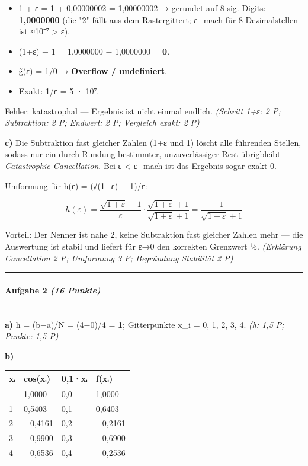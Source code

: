 \documentclass[11pt, a4paper]{article}
\begin{document}
\begin{itemize}
  \item 1 + ε = 1 + 0,00000002 = 1,00000002 → gerundet auf 8 sig. Digits: \textbf{1,0000000} (die "2" fällt aus dem Rastergittert; ε\_mach für 8 Dezimalstellen ist ≈10⁻⁷ > ε).
  \item (1+ε) − 1 = 1,0000000 − 1,0000000 = \textbf{0}.
  \item g̃(ε) = 1/0 → \textbf{Overflow / undefiniert}.
  \item Exakt: 1/ε = 5 · 10⁷.
\end{itemize}

Fehler: katastrophal — Ergebnis ist nicht einmal endlich. \textit{(Schritt 1+ε: 2 P; Subtraktion: 2 P; Endwert: 2 P; Vergleich exakt: 2 P)}


\textbf{c)} Die Subtraktion fast gleicher Zahlen (1+ε und 1) löscht alle führenden Stellen, sodass nur ein durch Rundung bestimmter, unzuverlässiger Rest übrigbleibt — \textit{Catastrophic Cancellation}. Bei ε < ε\_mach ist das Ergebnis sogar exakt 0.


Umformung für h(ε) = (√(1+ε) − 1)/ε:


\[
h(\varepsilon) = \frac{\sqrt{1+\varepsilon}-1}{\varepsilon} \cdot \frac{\sqrt{1+\varepsilon}+1}{\sqrt{1+\varepsilon}+1} = \frac{1}{\sqrt{1+\varepsilon}+1}
\]


Vorteil: Der Nenner ist nahe 2, keine Subtraktion fast gleicher Zahlen mehr — die Auswertung ist stabil und liefert für ε→0 den korrekten Grenzwert ½. \textit{(Erklärung Cancellation 2 P; Umformung 3 P; Begründung Stabilität 2 P)}



\noindent\textcolor{rulegray}{\rule{\linewidth}{0.4pt}}


\paragraph{Aufgabe 2 \textit{(16 Punkte)}}\mbox{}\\[2pt]

\textbf{a)} h = (b−a)/N = (4−0)/4 = \textbf{1}; Gitterpunkte x\_i = 0, 1, 2, 3, 4. \textit{(h: 1,5 P; Punkte: 1,5 P)}


\textbf{b)}



{\small
\begin{tabularx}{\linewidth}{XXXX}
\hline
\rowcolor{tableheadbg}
{\color{white}\textbf{xᵢ}} & {\color{white}\textbf{cos(xᵢ)}} & {\color{white}\textbf{0,1·xᵢ}} & {\color{white}\textbf{f(xᵢ)}} \\[2pt]
\hline
\endhead
\hline
\endfoot
0 & 1,0000 & 0,0 & 1,0000 \\
1 & 0,5403 & 0,1 & 0,6403 \\
2 & −0,4161 & 0,2 & −0,2161 \\
3 & −0,9900 & 0,3 & −0,6900 \\
4 & −0,6536 & 0,4 & −0,2536 \\
\end{tabularx}
}
\end{document}
